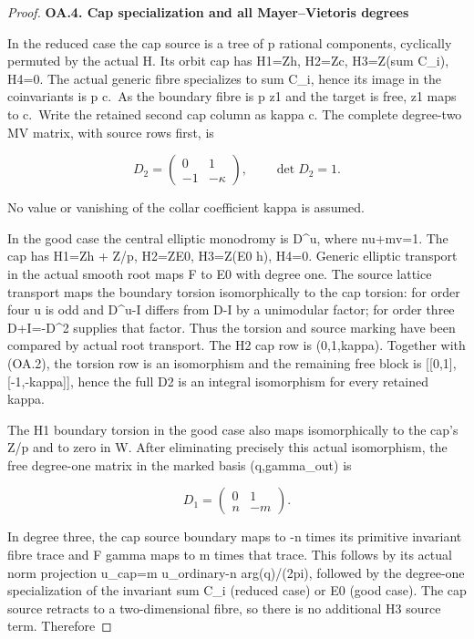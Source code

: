 \begin{proof}
\par

\medskip\noindent\textbf{OA.4. Cap specialization and all Mayer--Vietoris degrees}

In the reduced case the cap source is a tree of p rational
components, cyclically permuted by the actual H. Its orbit cap
has H1=Zh, H2=Zc, H3=Z(sum C\_i), H4=0. The actual generic
fibre specializes to sum C\_i, hence its image in the coinvariants
is p c.~As the boundary fibre is p z1 and the target is free,
z1 maps to c.~Write the retained second cap column as kappa c.
The complete degree-two MV matrix, with source rows first, is

\[
D_2=\begin{pmatrix}0&1\\-1&-\kappa\end{pmatrix},\qquad\det D_2=1.\tag{OA.3}
\]

No value or vanishing of the collar coefficient kappa is assumed.

In the good case the central elliptic monodromy is D\^{}u, where
nu+mv=1. The cap has H1=Zh + Z/p, H2=ZE0, H3=Z(E0 h),
H4=0. Generic elliptic transport in the actual smooth root maps
F to E0 with degree one. The source lattice transport maps the
boundary torsion isomorphically to the cap torsion: for order
four u is odd and D\^{}u-I differs from D-I by a unimodular
factor; for order three D+I=-D\^{}2 supplies that factor. Thus
the torsion and source marking have been compared by actual
root transport. The H2 cap row is (0,1,kappa). Together with
(OA.2), the torsion row is an isomorphism and the remaining
free block is {[}{[}0,1{]},{[}-1,-kappa{]}{]}, hence the full D2 is an
integral isomorphism for every retained kappa.

The H1 boundary torsion in the good case also maps isomorphically
to the cap's Z/p and to zero in W. After eliminating precisely
this actual isomorphism, the free degree-one matrix in the
marked basis (q,gamma\_out) is

\[
D_1=\begin{pmatrix}0&1\\n&-m\end{pmatrix}.\tag{OA.4}
\]

In degree three, the cap source boundary maps to -n times its
primitive invariant fibre trace and F gamma maps to m times
that trace. This follows by its actual norm projection
u\_cap=m u\_ordinary-n arg(q)/(2pi), followed by the degree-one
specialization of the invariant sum C\_i (reduced case) or E0
(good case). The cap source retracts to a two-dimensional
fibre, so there is no additional H3 source term. Therefore


\end{proof}

